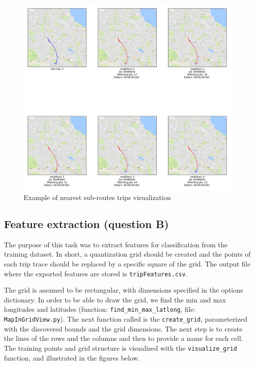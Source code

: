 \documentclass[12pt]{article}
\begin{document}
	\begin{figure} [H]
		\begin{center}
			\includegraphics [scale = 0.50] {question2a2example.jpg}
			\caption{Example of nearest sub-routes trips visualization}
		\end{center}
	\end{figure} 
	
  
	\subsection{Feature extraction (question B)}
	The purpose of this task was to extract features for classification from the
  training dataset. In short, a quantization grid should be created and the points of each trip trace should be replaced by a specific square of the grid. The output file where the exported features are stored is \texttt{tripFeatures.csv}.
	
The grid is assumed to be rectangular, with dimensions specified in the options
dictionary. In order to be able to draw the grid, we find the min and max
longitudes and latitudes (function: \texttt{find\_min\_max\_latlong}, file:
\texttt{MapInGridView.py}). The next function called is the
\texttt{create\_grid}, parameterized with the discovered bounds and the grid
dimensions. The next step is to create the lines of the rows and the columns and
then to provide a name for each cell. The training points and grid structure is
visualized with the \texttt{visualize\_grid} function, and illustrated in the
figures below.
	
\end{document}
